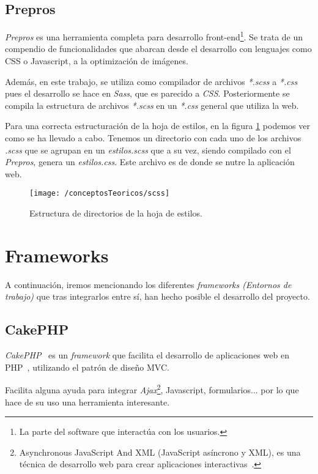 \subsection{Prepros}

\textit{Prepros} es una herramienta completa para desarrollo front-end\footnote{La parte del software que interactúa con los usuarios.}. Se trata de un compendio de funcionalidades que abarcan desde el desarrollo con lenguajes como CSS o Javascript, a la optimización de imágenes.

Además, en este trabajo, se utiliza como compilador de archivos \textit{*.scss} a \textit{*.css} pues el desarrollo se hace en \textit{Sass}, que es parecido a \textit{CSS}. Posteriormente se compila la estructura de archivos \textit{*.scss} en un \textit{*.css} general que utiliza la web.

Para una correcta estructuración de la hoja de estilos, en la figura \ref{fig:scss} podemos ver como se ha llevado a cabo.
Tenemos un directorio con cada uno de los archivos \textit{.scss} que se agrupan en un \textit{estilos.scss} que a su vez, siendo compilado con el \textit{Prepros}, genera un \textit{estilos.css}. Este archivo es de donde se nutre la aplicación web.

\begin{figure}[ht]
	\centering
	\texttt{[image: /conceptosTeoricos/scss]}
	\caption{Estructura de directorios de la hoja de estilos.}
	\label{fig:scss}
\end{figure}

\newpage

\section{Frameworks }

A continuación, iremos mencionando los diferentes \textit{frameworks (Entornos de trabajo)} que tras integrarlos entre sí, han hecho posible el desarrollo del proyecto.

\subsection{CakePHP}

\textit{CakePHP}~\cite{web:cakephp} es un \textit{framework} que facilita el desarrollo de aplicaciones web en PHP~\cite{wiki:cakephp}, utilizando el patrón de diseño MVC.

Facilita alguna ayuda para integrar \textit{Ajax}\footnote{Asynchronous JavaScript And XML (JavaScript asíncrono y XML), es una técnica de desarrollo web para crear aplicaciones interactivas~\cite{wiki:ajax}.}, Javascript, formularios... por lo que hace de su uso una herramienta interesante.

